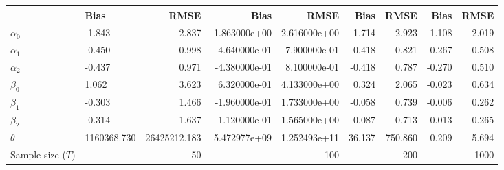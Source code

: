 
\begin{tabular}[t]{llrrrrrrr}
\toprule
  & Bias & RMSE & Bias & RMSE & Bias & RMSE & Bias & RMSE\\
\midrule
$\alpha_{0}$ & -1.843 & 2.837 & -1.863000e+00 & 2.616000e+00 & -1.714 & 2.923 & -1.108 & 2.019\\
$\alpha_{1}$ & -0.450 & 0.998 & -4.640000e-01 & 7.900000e-01 & -0.418 & 0.821 & -0.267 & 0.508\\
$\alpha_{2}$ & -0.437 & 0.971 & -4.380000e-01 & 8.100000e-01 & -0.418 & 0.787 & -0.270 & 0.510\\
$\beta_{0}$ & 1.062 & 3.623 & 6.320000e-01 & 4.133000e+00 & 0.324 & 2.065 & -0.023 & 0.634\\
$\beta_{1}$ & -0.303 & 1.466 & -1.960000e-01 & 1.733000e+00 & -0.058 & 0.739 & -0.006 & 0.262\\
$\beta_{2}$ & -0.314 & 1.637 & -1.120000e-01 & 1.565000e+00 & -0.087 & 0.713 & 0.013 & 0.265\\
$\theta$ & 1160368.730 & 26425212.183 & 5.472977e+09 & 1.252493e+11 & 36.137 & 750.860 & 0.209 & 5.694\\
Sample size ($T$) &  & 50 &  & 100 &  & 200 &  & 1000\\
\bottomrule
\end{tabular}
